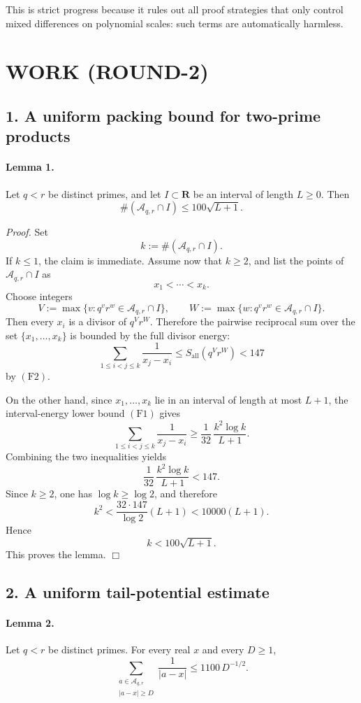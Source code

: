 This is strict progress because it rules out all proof strategies that only control mixed differences on polynomial scales: such terms are automatically harmless.

\section{WORK (ROUND-2)}

\subsection*{1. A uniform packing bound for two-prime products}

\paragraph{Lemma 1.}
Let \(q<r\) be distinct primes, and let \(I\subset \mathbf R\) be an interval of length \(L\ge 0\). Then
\[
\#(\mathcal A_{q,r}\cap I)\le 100\sqrt{L+1}.
\]

\emph{Proof.}
Set
\[
k:=\#(\mathcal A_{q,r}\cap I).
\]
If \(k\le 1\), the claim is immediate. Assume now that \(k\ge 2\), and list the points of \(\mathcal A_{q,r}\cap I\) as
\[
x_1<\cdots<x_k.
\]
Choose integers
\[
V:=\max\{v: q^v r^w\in \mathcal A_{q,r}\cap I\},
\qquad
W:=\max\{w: q^v r^w\in \mathcal A_{q,r}\cap I\}.
\]
Then every \(x_i\) is a divisor of \(q^V r^W\). Therefore the pairwise reciprocal sum over the set \(\{x_1,\dots,x_k\}\) is bounded by the full divisor energy:
\[
\sum_{1\le i<j\le k}\frac{1}{x_j-x_i}
\le
S_{\mathrm{all}}(q^V r^W)
<147
\]
by \((\mathrm{F2})\).

On the other hand, since \(x_1,\dots,x_k\) lie in an interval of length at most \(L+1\), the interval-energy lower bound \((\mathrm{F1})\) gives
\[
\sum_{1\le i<j\le k}\frac{1}{x_j-x_i}
\ge
\frac{1}{32}\,\frac{k^2\log k}{L+1}.
\]
Combining the two inequalities yields
\[
\frac{1}{32}\,\frac{k^2\log k}{L+1}<147.
\]
Since \(k\ge 2\), one has \(\log k\ge \log 2\), and therefore
\[
k^2<\frac{32\cdot 147}{\log 2}(L+1)<10000(L+1).
\]
Hence
\[
k<100\sqrt{L+1}.
\]
This proves the lemma.
\hfill\(\Box\)

\subsection*{2. A uniform tail-potential estimate}

\paragraph{Lemma 2.}
Let \(q<r\) be distinct primes. For every real \(x\) and every \(D\ge 1\),
\[
\sum_{\substack{a\in\mathcal A_{q,r}\\ |a-x|\ge D}}\frac{1}{|a-x|}
\le 1100\,D^{-1/2}.
\]

